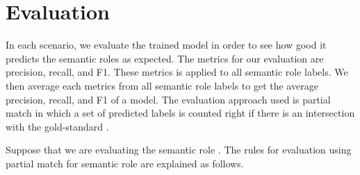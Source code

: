 \section{Evaluation}
In each scenario, we evaluate the trained model in order to see how good it predicts the semantic roles as expected. The metrics for our evaluation are precision, recall, and F1. These metrics is applied to all semantic role labels. We then average each metrics from all semantic role labels to get the average precision, recall, and F1 of a model. The evaluation approach used is partial match in which a set of predicted labels is counted right if there is an intersection with the gold-standard \citep{seki2003probabilistic}. 

Suppose that we are evaluating the semantic role \patient. The rules for evaluation using partial match for semantic role \patient are explained as follows.

